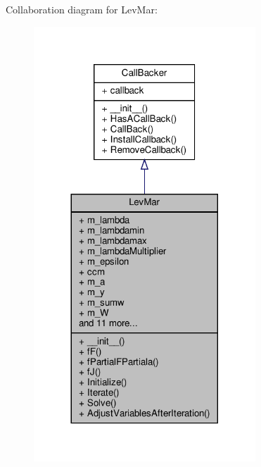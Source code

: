 Collaboration diagram for Lev\+Mar\+:
\nopagebreak
\begin{figure}[H]
\begin{center}
\leavevmode
\includegraphics[width=236pt]{classSignalIntegrity_1_1Fit_1_1LevMar_1_1LevMar__coll__graph}
\end{center}
\end{figure}
